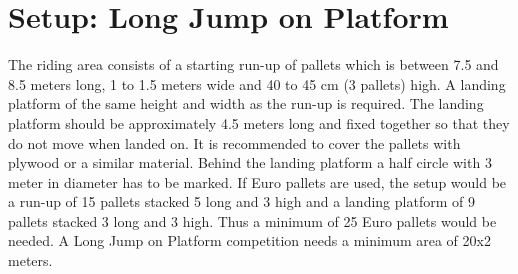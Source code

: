\section{Setup: Long Jump on Platform}
The riding area consists of a starting run-up of pallets which is between 7.5 and 8.5 meters long, 1 to 1.5 meters wide and 40 to 45 cm (3 pallets) high.
A landing platform of the same height and width as the run-up is required.
The landing platform should be approximately 4.5 meters long and fixed together so that they do not move when landed on.
It is recommended to cover the pallets with plywood or a similar material.
Behind the landing platform a half circle with 3 meter in diameter has to be marked.
If Euro pallets are used, the setup would be a run-up of 15 pallets stacked 5 long and 3 high and a landing platform of 9 pallets stacked 3 long and 3 high.
Thus a minimum of 25 Euro pallets would be needed.
A Long Jump on Platform competition needs a minimum area of 20x2 meters.
